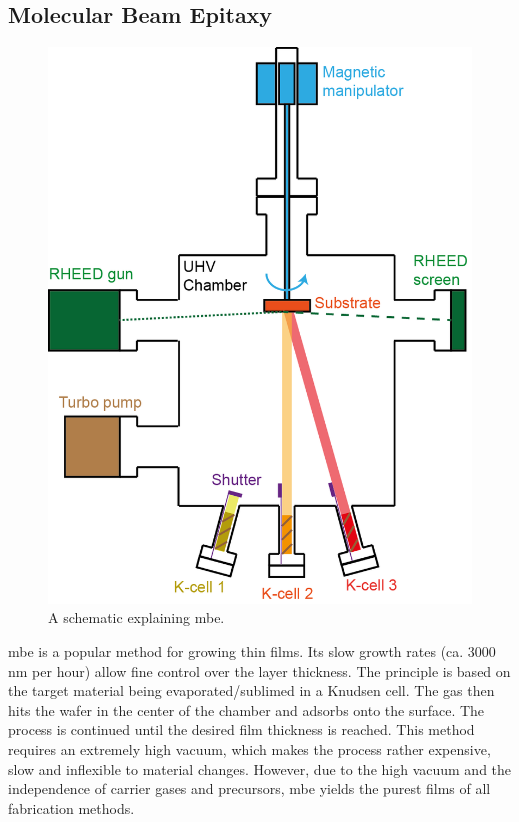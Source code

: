 {\subsection{Molecular Beam Epitaxy} 
\begin{figure}
    \centering
    \includegraphics[scale=.5]{03_fabrication/fig/molecular_beam_epitaxy.png}
    \caption{A schematic explaining \gls{mbe}. \cite{Zeljkovic2015}}
    \label{fig:fabrication_mbe}
\end{figure}
\Gls{mbe} is a popular method for growing thin films. Its slow growth rates (ca. 3000 nm per hour) allow fine control over the layer thickness. The principle is based on the target material being evaporated/sublimed in a Knudsen cell. The gas then hits the wafer in the center of the chamber and adsorbs onto the surface. The process is continued until the desired film thickness is reached. This method requires an extremely high vacuum, which makes the process rather expensive, slow and inflexible to material changes.  However, due to the high vacuum and the independence of carrier gases and precursors, \gls{mbe} yields the purest films of all fabrication methods.
}
